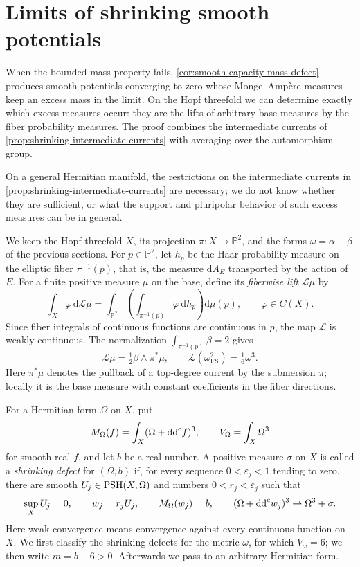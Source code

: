 \section{Limits of shrinking smooth potentials}\label{sec:hopf-defect-classification}

When the bounded mass property fails, \cref{cor:smooth-capacity-mass-defect} produces smooth potentials converging to zero whose Monge--Amp\`ere measures keep an excess mass in the limit. On the Hopf threefold we can determine exactly which excess measures occur: they are the lifts of arbitrary base measures by the fiber probability measures. The proof combines the intermediate currents of \cref{prop:shrinking-intermediate-currents} with averaging over the automorphism group.

On a general Hermitian manifold, the restrictions on the intermediate currents in \cref{prop:shrinking-intermediate-currents} are necessary; we do not know whether they are sufficient, or what the support and pluripolar behavior of such excess measures can be in general.

We keep the Hopf threefold $X$, its projection $\pi\colon X\to\mathbb P^2$, and the forms $\omega=\alpha+\beta$ of the previous sections. For $p\in\mathbb P^2$, let $h_p$ be the Haar probability measure on the elliptic fiber $\pi^{-1}(p)$, that is, the measure $\mathrm{d}A_E$ transported by the action of $E$. For a finite positive measure $\mu$ on the base, define its \emph{fiberwise lift} $\mathcal L\mu$ by
\[
 \int_X\varphi\,\mathrm{d}\mathcal L\mu
 =\int_{\mathbb P^2}\left(\int_{\pi^{-1}(p)}\varphi\,\mathrm{d}h_p\right)\mathrm{d}\mu(p),
 \qquad\varphi\in C(X).
\]
Since fiber integrals of continuous functions are continuous in $p$, the map $\mathcal L$ is weakly continuous. The normalization $\int_{\pi^{-1}(p)}\beta=2$ gives
\begin{equation}\label{eq:hopf-fiber-lift-normalization}
 \mathcal L\mu=\tfrac12\beta\wedge\pi^*\mu,
 \qquad \mathcal L(\omega_{\mathrm{FS}}^2)=\tfrac16\omega^3.
\end{equation}
Here $\pi^*\mu$ denotes the pullback of a top-degree current by the submersion $\pi$; locally it is the base measure with constant coefficients in the fiber directions.

For a Hermitian form $\Omega$ on $X$, put
\[
 M_\Omega(f)=\int_X(\Omega+\mathrm{dd}^{\mathrm{c}} f)^3,\qquad V_\Omega=\int_X\Omega^3
\]
for smooth real $f$, and let $b$ be a real number. A positive measure $\sigma$ on $X$ is called a \emph{shrinking defect} for $(\Omega,b)$ if, for every sequence $0<\varepsilon_j<1$ tending to zero, there are smooth $U_j\in\mathrm{PSH}(X,\Omega)$ and numbers $0<r_j<\varepsilon_j$ such that
\begin{equation}\label{eq:hopf-shrinking-realization}
 \sup_XU_j=0,\qquad w_j=r_jU_j,\qquad
 M_\Omega(w_j)=b,\qquad
 (\Omega+\mathrm{dd}^{\mathrm{c}} w_j)^3\rightharpoonup\Omega^3+\sigma.
\end{equation}
Here weak convergence means convergence against every continuous function on $X$. We first classify the shrinking defects for the metric $\omega$, for which $V_\omega=6$; we then write $m=b-6>0$. Afterwards we pass to an arbitrary Hermitian form.

